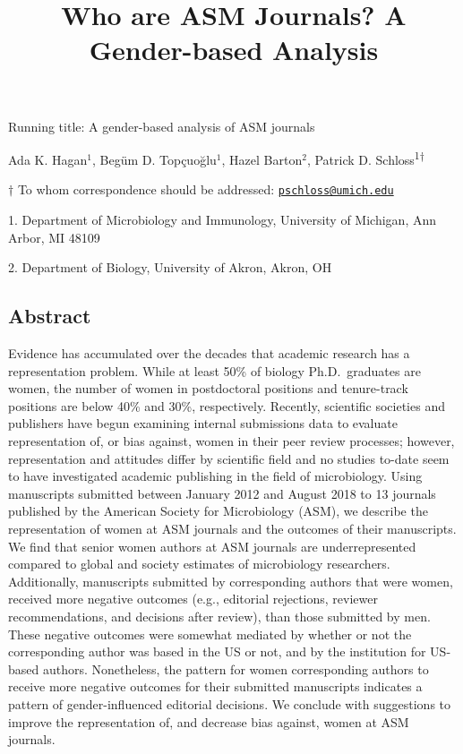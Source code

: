 \documentclass[11pt,]{article}
\title{\textbf{Who are ASM Journals? A Gender-based Analysis}}
\author{}
\date{}
\begin{document}
\maketitle

\vspace{35mm}

Running title: A gender-based analysis of ASM journals

\vspace{35mm}

Ada K. Hagan\({^1}\), Begüm D. Topçuoğlu\({^1}\), Hazel Barton\({^2}\),
Patrick D. Schloss\textsuperscript{1\(\dagger\)}

\vspace{40mm}

\(\dagger\) To whom correspondence should be addressed:
\href{mailto:pschloss@umich.edu}{\nolinkurl{pschloss@umich.edu}}

1. Department of Microbiology and Immunology, University of Michigan,
Ann Arbor, MI 48109

2. Department of Biology, University of Akron, Akron, OH

\newpage

\linenumbers

\subsection{Abstract}\label{abstract}

Evidence has accumulated over the decades that academic research has a
representation problem. While at least 50\% of biology Ph.D.~graduates
are women, the number of women in postdoctoral positions and
tenure-track positions are below 40\% and 30\%, respectively. Recently,
scientific societies and publishers have begun examining internal
submissions data to evaluate representation of, or bias against, women
in their peer review processes; however, representation and attitudes
differ by scientific field and no studies to-date seem to have
investigated academic publishing in the field of microbiology. Using
manuscripts submitted between January 2012 and August 2018 to 13
journals published by the American Society for Microbiology (ASM), we
describe the representation of women at ASM journals and the outcomes of
their manuscripts. We find that senior women authors at ASM journals are
underrepresented compared to global and society estimates of
microbiology researchers. Additionally, manuscripts submitted by
corresponding authors that were women, received more negative outcomes
(e.g., editorial rejections, reviewer recommendations, and decisions
after review), than those submitted by men. These negative outcomes were
somewhat mediated by whether or not the corresponding author was based
in the US or not, and by the institution for US-based authors.
Nonetheless, the pattern for women corresponding authors to receive more
negative outcomes for their submitted manuscripts indicates a pattern of
gender-influenced editorial decisions. We conclude with suggestions to
improve the representation of, and decrease bias against, women at ASM
journals.
\end{document}
